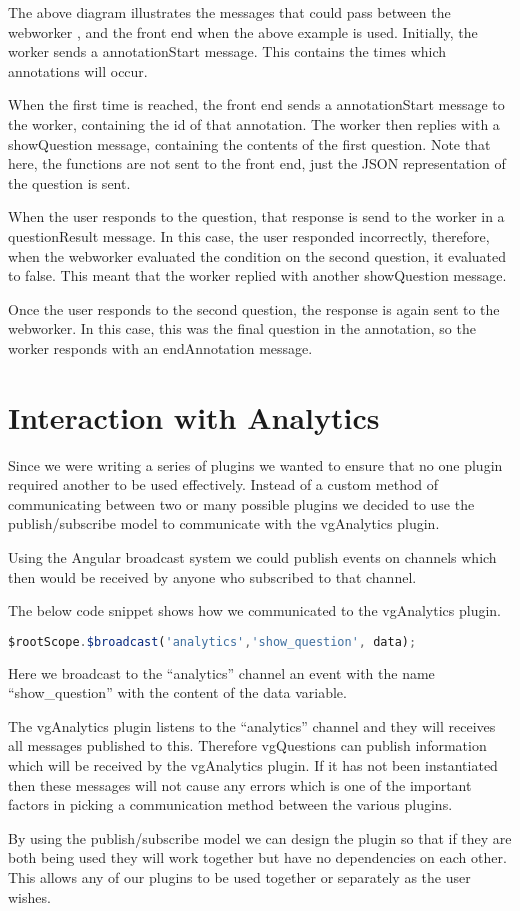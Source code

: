 The above diagram illustrates the messages that could pass between the \gls{webworker}
, and the front end when the above example is used. Initially, the worker
sends a annotationStart message. This contains the times which annotations will
occur.

When the first time is reached, the front end sends a annotationStart
message to the worker, containing the id of that annotation. The worker then
replies with a showQuestion message, containing the contents of the first
question. Note that here, the functions are not sent to the front end, just the
JSON representation of the question is sent.

When the user responds to the question, that response is send to the worker in
a questionResult message. In this case, the user responded incorrectly,
therefore, when the \gls{webworker} evaluated the condition on the second question,
it evaluated to false. This meant that the worker replied with another
showQuestion message.

Once the user responds to the second question, the response is again sent to
the \gls{webworker}. In this case, this was the final question in the annotation, so
the worker responds with an endAnnotation message.

\section{Interaction with Analytics}
\label{Section:vgQuestions Analytics}

Since we were writing a series of plugins we wanted to ensure that no one
plugin required another to be used effectively. Instead of a custom method of
communicating between two or many possible plugins we decided to use the
publish/subscribe model to communicate with the vgAnalytics plugin.

Using the Angular broadcast system we could publish events on channels which
then would be received by anyone who subscribed to that channel.

The below code snippet shows how we communicated to the vgAnalytics plugin.

\begin{lstlisting}[language=javascript]
$rootScope.$broadcast('analytics','show_question', data);
\end{lstlisting}

Here we broadcast to the ``analytics'' channel an event with the name
``show\_question'' with the content of the data variable.

The vgAnalytics plugin listens to the ``analytics'' channel and they will
receives all messages published to this. Therefore vgQuestions can publish
information which will be received by the vgAnalytics plugin. If it has not
been instantiated then these messages will not cause any errors which is one of
the important factors in picking a communication method between the various
plugins.

By using the publish/subscribe model we can design the plugin so that if they
are both being used they will work together but have no dependencies on each
other. This allows any of our plugins to be used together or separately as the
user wishes.
